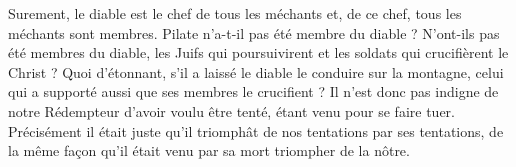 Surement, le diable est le chef de tous les méchants et, de ce chef, tous les méchants sont membres. Pilate n’a-t-il pas été membre du diable ? N’ont-ils pas été membres du diable, les Juifs qui poursuivirent et les soldats qui crucifièrent le Christ ? Quoi d’étonnant, s’il a laissé le diable le conduire sur la montagne, celui qui a supporté aussi que ses membres le crucifient ? Il n’est donc pas indigne de notre Rédempteur d’avoir voulu être tenté, étant venu pour se faire tuer. Précisément il était juste qu’il triomphât de nos tentations par ses tentations, de la même façon qu’il était venu par sa mort triompher de la nôtre.
